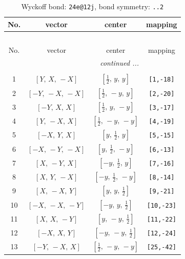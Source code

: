 \documentclass[fleqn,8pt]{jsarticle}
\begin{document}
\begin{longtable}{cccc}
\caption{Wyckoff bond: {\tt 24e@12j}, bond symmetry: {\tt ..2}}
 \\
 \hline \hline
No. & vector & center & mapping \\ \hline \endfirsthead

\multicolumn{3}{l}{\tablename\ \thetable{}} \\
 \hline \hline
No. & vector & center & mapping \\ \hline \endhead

 \hline \hline
\multicolumn{3}{r}{\footnotesize\it continued ...} \\ \endfoot

 \hline \hline
\multicolumn{3}{r}{} \\ \endlastfoot

1 & $\left[ Y,\, X,\, - X \right]$ & $\left[ \frac{1}{2},\, y,\, y \right]$ & {\tt [1,-18]} \\ \hline
2 & $\left[ - Y,\, - X,\, - X \right]$ & $\left[ \frac{1}{2},\, - y,\, y \right]$ & {\tt [2,-20]} \\ \hline
3 & $\left[ - Y,\, X,\, X \right]$ & $\left[ \frac{1}{2},\, y,\, - y \right]$ & {\tt [3,-17]} \\ \hline
4 & $\left[ Y,\, - X,\, X \right]$ & $\left[ \frac{1}{2},\, - y,\, - y \right]$ & {\tt [4,-19]} \\ \hline
5 & $\left[ - X,\, Y,\, X \right]$ & $\left[ y,\, \frac{1}{2},\, y \right]$ & {\tt [5,-15]} \\ \hline
6 & $\left[ - X,\, - Y,\, - X \right]$ & $\left[ y,\, \frac{1}{2},\, - y \right]$ & {\tt [6,-13]} \\ \hline
7 & $\left[ X,\, - Y,\, X \right]$ & $\left[ - y,\, \frac{1}{2},\, y \right]$ & {\tt [7,-16]} \\ \hline
8 & $\left[ X,\, Y,\, - X \right]$ & $\left[ - y,\, \frac{1}{2},\, - y \right]$ & {\tt [8,-14]} \\ \hline
9 & $\left[ X,\, - X,\, Y \right]$ & $\left[ y,\, y,\, \frac{1}{2} \right]$ & {\tt [9,-21]} \\ \hline
10 & $\left[ - X,\, - X,\, - Y \right]$ & $\left[ - y,\, y,\, \frac{1}{2} \right]$ & {\tt [10,-23]} \\ \hline
11 & $\left[ X,\, X,\, - Y \right]$ & $\left[ y,\, - y,\, \frac{1}{2} \right]$ & {\tt [11,-22]} \\ \hline
12 & $\left[ - X,\, X,\, Y \right]$ & $\left[ - y,\, - y,\, \frac{1}{2} \right]$ & {\tt [12,-24]} \\ \hline
13 & $\left[ - Y,\, - X,\, X \right]$ & $\left[ \frac{1}{2},\, - y,\, - y \right]$ & {\tt [25,-42]} \\ \hline

\end{longtable}
\end{document}
